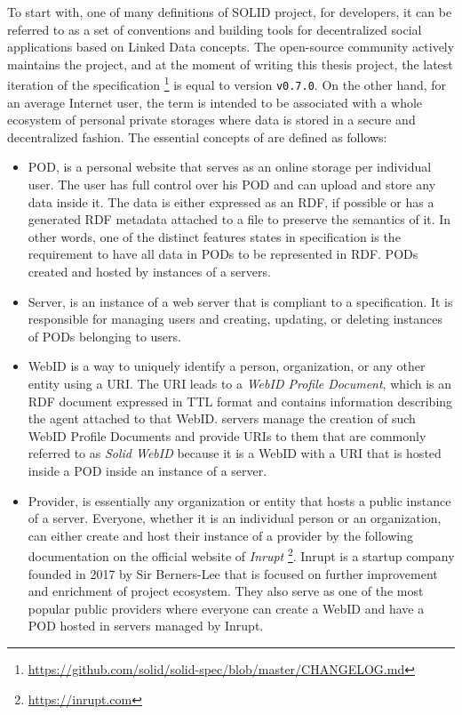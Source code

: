 To start with, one of many definitions of SOLID project, for developers, it can be referred to as a set of conventions and building tools for decentralized social applications based on Linked Data concepts. The open-source community actively maintains the project, and at the moment of writing this thesis project, the latest iteration of the specification \footnote{\url{https://github.com/solid/solid-spec/blob/master/CHANGELOG.md}} is equal to version \texttt{v0.7.0}. On the other hand, for an average Internet user, the term \solid{} is intended to be associated with a whole ecosystem of personal private storages where data is stored in a secure and decentralized fashion. The essential concepts of \solid{} are defined as follows:
\begin{itemize}
    \item \solid{} \acrfull{POD}, is a personal website that serves as an online storage per individual user. The user has full control over his POD and can upload and store any data inside it. The data is either expressed as an RDF, if possible or has a generated RDF metadata attached to a file to preserve the semantics of it. In other words, one of the distinct features states in \solid{} specification is the requirement to have all data in PODs to be represented in RDF. PODs created and hosted by instances of a \solid{} servers.
    \item \solid{} Server, is an instance of a web server that is compliant to a \solid{} specification. It is responsible for managing users and creating, updating, or deleting instances of PODs belonging to users.
    \item WebID is a way to uniquely identify a person, organization, or any other entity using a URI. The URI leads to a \textit{WebID Profile Document}, which is an RDF document expressed in TTL format and contains information describing the agent attached to that WebID. \solid{} servers manage the creation of such WebID Profile Documents and provide URIs to them that are commonly referred to as \textit{Solid WebID} because it is a WebID with a URI that is hosted inside a POD inside an instance of a \solid{} server.
    \item \solid{} Provider, is essentially any organization or entity that hosts a public instance of a \solid{} server. Everyone, whether it is an individual person or an organization, can either create and host their instance of a \solid{} provider by the following documentation on the official website of \textit{Inrupt} \footnote{\url{https://inrupt.com}}. Inrupt is a startup company founded in 2017 by Sir Berners-Lee that is focused on further improvement and enrichment of \solid{} project ecosystem. They also serve as one of the most popular public \solid{} providers where everyone can create a WebID and have a POD hosted in \solid{} servers managed by Inrupt. 

\end{itemize}
